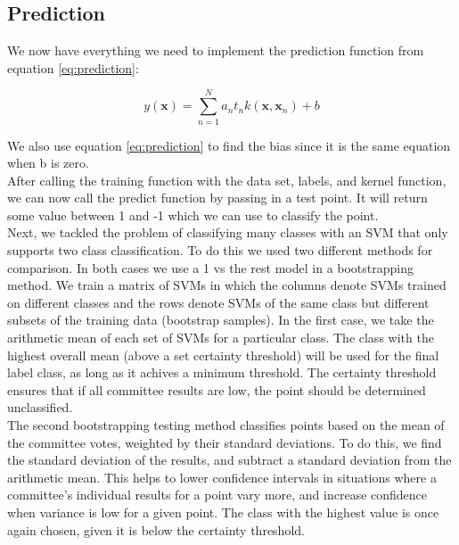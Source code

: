 \documentclass[journal]{IEEEtran}
\begin{document}
    \subsection{Prediction}
    We now have everything we need to implement the prediction function from equation \ref{eq:prediction}:

    \begin{equation}
    \label{eq:prediction}
    y(\mathbf{x}) = \sum\limits_{n = 1}^N a_n t_n k(\mathbf{x}, \mathbf{x}_n) + b
    \end{equation}

    We also use equation \ref{eq:prediction} to find the bias since it is the same equation when b is zero.\\

    After calling the training function with the data set, labels, and kernel function, we can now call the predict function by passing in a test point.  It will return some value between 1 and -1 which we can use to classify the point.\\

    Next, we tackled the problem of classifying many classes with an SVM that only supports two class classification. To do this we used two different methods for comparison. In both cases we use a 1 vs the rest model in a bootstrapping method. We train a matrix of SVMs in which the columns denote SVMs trained on different classes and the rows denote SVMs of the same class but different subsets of the training data (bootstrap samples). In the first case, we take the arithmetic mean of each set of SVMs for a particular class. The class with the highest overall mean (above a set certainty threshold) will be used for the final label class, as long as it achives a minimum threshold. The certainty threshold ensures that if all committee results are low, the point should be determined unclassified.\\

    The second bootstrapping testing method classifies points based on the mean of the committee votes, weighted by their standard deviations. To do this, we find the standard deviation of the results, and subtract a standard deviation from the arithmetic mean. This helps to lower confidence intervals in situations where a committee’s individual results for a point vary more, and increase confidence when variance is low for a given point. The class with the highest value is once again chosen, given it is below the certainty threshold. \\
\end{document}
